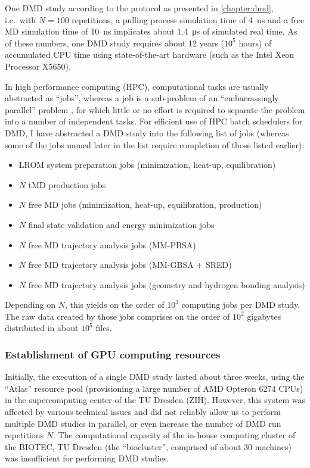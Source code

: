 One DMD study according to the protocol as presented in \cref{chapter:dmd},
i.e.\ with $N = 100$ repetitions, a pulling process simulation time of
\SI{4}{\nano\second} and a free MD simulation time of \SI{10}{\nano\second}
implicates about \SI{1.4}{\micro\second} of simulated real time. As of these
numbers, one DMD study requires about 12 years ($10^5$ hours) of accumulated CPU
time using state-of-the-art hardware (such as the Intel Xeon Processor X5650).

In high performance computing (HPC), computational tasks are usually abstracted as
\enquote{jobs}, whereas a job is a sub-problem of an \enquote{embarrassingly
parallel} problem \cite{heath1986hypercube}, for which little or no effort is
required to separate the problem into a number of independent tasks. For
efficient use of HPC batch schedulers for DMD, I have abstracted a DMD study
into the following list of jobs (whereas some of the jobs named later in the
list require completion of those listed earlier):

\begin{itemize}
\item LROM system preparation jobs (minimization, heat-up, equilibration)
\item $N$ tMD production jobs
\item $N$ free MD jobs (minimization, heat-up, equilibration, production)
\item $N$ final state validation and energy minimization jobs
\item $N$ free MD trajectory analysis jobs (MM-PBSA)
\item $N$ free MD trajectory analysis jobs (MM-GBSA + SRED)
\item $N$ free MD trajectory analysis jobs (geometry and hydrogen bonding
analysis)
\end{itemize}

Depending on $N$, this yields on the order of $10^3$ computing jobs per DMD
study. The raw data created by those jobs comprises on the order of $10^2$
gigabytes distributed in about $10^5$ files.


\subsubsection{Establishment of GPU computing resources}

Initially, the execution of a single DMD study lasted about three weeks, using
the \enquote{Atlas} resource pool (provisioning a large number of AMD Opteron
6274 CPUs) in the supercomputing center of the TU Dresden (ZIH). However, this
system was affected by various technical issues and did not reliably allow us to
perform multiple DMD studies in parallel, or even increase the number of DMD run
repetitions $N$. The computational capacity of the in-house computing cluster of
the BIOTEC, TU Dresden (the \enquote{biocluster}, comprised of about 30
machines) was insufficient for performing DMD studies.

